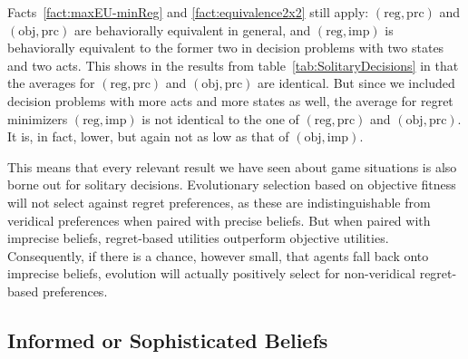 \documentclass[fleqn,reqno,12pt]{article}
\theoremstyle{Satz}
\theoremstyle{Bsp}
\begin{document}
Facts~\ref{fact:maxEU-minReg} and \ref{fact:equivalence2x2} still apply:
$(\text{reg}, \text{prc})$ and $(\text{obj}, \text{prc})$ are behaviorally equivalent in
general, and $(\text{reg}, \text{imp})$ is behaviorally equivalent to the former two in
decision problems with two states and two acts. This shows in the results from
table~\ref{tab:SolitaryDecisions} in that the averages for $(\text{reg}, \text{prc})$ and
$(\text{obj}, \text{prc})$ are identical. But since we included decision problems with more
acts and more states as well, the average for regret minimizers $(\text{reg}, \text{imp})$ is
not identical to the one of $(\text{reg}, \text{prc})$ and $(\text{obj}, \text{prc})$. It
is, in fact, lower, but again not as low as that of $(\text{obj}, \text{imp})$.

This means that every relevant result we have seen about game situations is also borne out for
solitary decisions. Evolutionary selection based on objective fitness will not select against
regret preferences, as these are indistinguishable from veridical preferences
when paired with precise beliefs. But when paired with imprecise beliefs, regret-based
utilities outperform objective utilities. Consequently, if there is a chance, however
small, that agents fall back onto imprecise beliefs, evolution will actually positively select
for non-veridical regret-based preferences.


\subsection{Informed or Sophisticated Beliefs}
\end{document}
